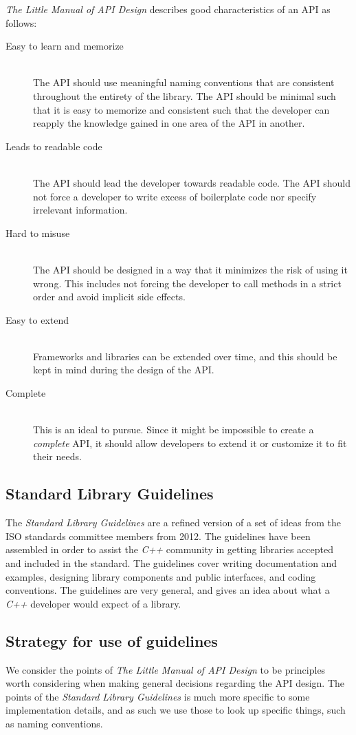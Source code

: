 \textit{The Little Manual of API Design} describes good characteristics of an API as follows:
\begin{description}
\item[Easy to learn and memorize] \hfill \\
The API should use meaningful naming conventions that are consistent throughout the entirety of the library. The API should be minimal such that it is easy to memorize and consistent such that the developer can reapply the knowledge gained in one area of the API in another.
\item[Leads to readable code] \hfill \\
The API should lead the developer towards readable code. The API should not force a developer to write excess of boilerplate code nor specify irrelevant information.
\item[Hard to misuse] \hfill \\
The API should be designed in a way that it minimizes the risk of using it wrong. This includes not forcing the developer to call methods in a strict order and avoid implicit side effects.
\item[Easy to extend]\hfill \\
Frameworks and libraries can be extended over time, and this should be kept in mind during the design of the API.
\item[Complete] \hfill \\
This is an ideal to pursue. Since it might be impossible to create a \textit{complete} API, it should allow developers to extend it or customize it to fit their needs.
\end{description}

\subsection{Standard Library Guidelines}
The \textit{Standard Library Guidelines} are a refined version of a set of ideas from the ISO standards committee members from 2012. The guidelines have been assembled in order to assist the \textit{C++} community in getting libraries accepted and included in the standard. The guidelines cover writing documentation and examples, designing library components and public interfaces, and coding conventions. The guidelines are very general, and gives an idea about what a \textit{C++} developer would expect of a library.

\subsection{Strategy for use of guidelines}
We consider the points of \textit{The Little Manual of API Design} to be principles worth considering when making general decisions regarding the API design. The points of the \textit{Standard Library Guidelines} is much more specific to some implementation details, and as such we use those to look up specific things, such as naming conventions.

